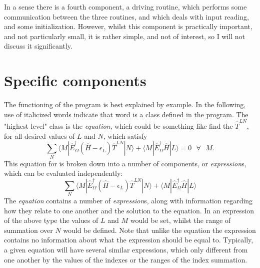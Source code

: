 \documentclass[12pt]{article}
\begin{document}
\noindent In a sense there is a fourth component, a driving routine, which
performs some communication between the three routines, and which deals with
input reading, and some initialization. However, whilst this component is practically
important, and not particularly small, it is rather simple, and not of
interest, so I will not discuss it significantly.

\section{ Specific components}
The functioning of the program is best explained by example. In the following,
use of italicized words indicate that word is a class defined in the program.
The "highest level" class is the \emph{equation}, which could be something like 
find the $\hat{T}^{LN}$, for all desired values of $L$ and $N$, which satisfy 
\begin{equation}
\sum_{N} 
\langle M | \hat{E}^{\dagger}_{\Omega} (\hat{H}-\epsilon_{L}) \hat{T}^{LN} | N \rangle  +
\langle M | \hat{E}^{\dagger}_{\Omega} \hat{H} | L  \rangle = 0 \text{ \ \ \ \ } \forall \text{ \ \ }  M . 
\end{equation}
\noindent This equation for is broken down into a number of components, 
or \emph{expression}s, which can be evaluated independently:
\begin{equation}
\sum_{N} 
\langle M | \hat{E}^{\dagger}_{\Omega} (\hat{H}-\epsilon_{L}) \hat{T}^{LN} | N \rangle  +
\langle M | \hat{E}^{\dagger}_{\Omega} \hat{H} | L  \rangle  
\label{eqn:Hylleras}
\end{equation}
\noindent The \emph{equation} contains a number of \emph{expression}s, along with
information regarding how they relate to one another and the solution to the equation.
In an expression of the above type the values of $L$ and $M$  would be set, whilst the range of
summation over $N$ would be defined. Note that unlike the equation the expression
contains no information about what the expression should be equal to.
Typically, a given equation will have several similar expressions,
which only different from one another by the values of the indexes or the 
ranges of the index summation.\\
\end{document}
